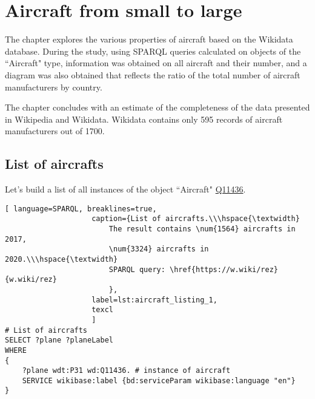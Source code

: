 \setchapterpreamble[u]{\margintoc}
\chapter{Aircraft from small to large\protect\footnotemark}


The chapter explores the various properties of aircraft based on the Wikidata database.
During the study, using SPARQL queries calculated on objects of the ``Aircraft" type, information was obtained on all aircraft and their number, 
and a diagram was also obtained that reflects the ratio of the total number of aircraft manufacturers by country.

The chapter concludes with an estimate of the completeness of the data presented in Wikipedia and Wikidata. 
Wikidata contains only 595 records of aircraft manufacturers out of \num{1700}.


\section{List of aircrafts}

Let's build a list of all instances of the object ``Aircraft" \href{https://www.wikidata.org/wiki/Q11436}{Q11436}.

\begin{lstlisting}[ language=SPARQL, breaklines=true, 
                    caption={List of aircrafts.\\\hspace{\textwidth}
                        The result contains \num{1564} aircrafts in 2017, 
                        \num{3324} aircrafts in 2020.\\\hspace{\textwidth}
                        SPARQL query: \href{https://w.wiki/rez}{w.wiki/rez}
                        },
                    label=lst:aircraft_listing_1,
                    texcl 
                    ]
# List of aircrafts
SELECT ?plane ?planeLabel
WHERE
{
    ?plane wdt:P31 wd:Q11436. # instance of aircraft
    SERVICE wikibase:label {bd:serviceParam wikibase:language "en"}
}
\end{lstlisting}

